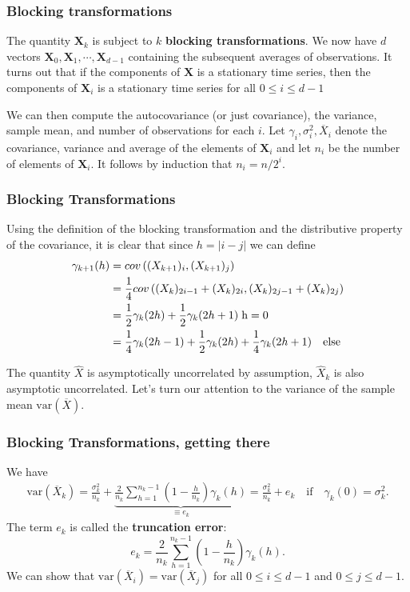 \documentclass{beamer}
\begin{document}
\begin{frame}
\frametitle{Blocking transformations}

The quantity $\bm{X}_k$ is
subject to $k$ \textbf{blocking transformations}.  We now have $d$ vectors
$\bm{X}_0, \bm{X}_1,\cdots,\bm{X}_{d-1}$ containing the subsequent
averages of observations. It turns out that if the components of
$\bm{X}$ is a stationary time series, then the components of
$\bm{X}_i$ is a stationary time series for all $0 \leq i \leq d-1$

We can then compute the autocovariance (or just covariance), the variance, sample mean, and
number of observations for each $i$. 
Let $\gamma_i, \sigma_i^2,
\overline{X}_i$ denote the covariance, variance and average of the
elements of $\bm{X}_i$ and let $n_i$ be the number of elements of
$\bm{X}_i$. It follows by induction that $n_i = n/2^i$.
\end{frame}

\begin{frame}
\frametitle{Blocking Transformations}

Using the
definition of the blocking transformation and the distributive
property of the covariance, it is clear that since $h =|i-j|$
we can define
\begin{align}
\gamma_{k+1}(h) &= cov\left( ({X}_{k+1})_{i}, ({X}_{k+1})_{j} \right) \nonumber \\
&=  \frac{1}{4}cov\left( ({X}_{k})_{2i-1} + ({X}_{k})_{2i}, ({X}_{k})_{2j-1} + ({X}_{k})_{2j} \right) \nonumber \\
&=  \frac{1}{2}\gamma_{k}(2h) + \frac{1}{2}\gamma_k(2h+1) \hspace{0.1cm} \mathrm{h = 0} \\
&=\frac{1}{4}\gamma_k(2h-1) + \frac{1}{2}\gamma_k(2h) + \frac{1}{4}\gamma_k(2h+1) \quad \mathrm{else}
\end{align}

The quantity $\hat{X}$ is asymptotically uncorrelated by assumption, $\hat{X}_k$ is also asymptotic uncorrelated. Let's turn our attention to the variance of the sample
mean $\mathrm{var}(\overline{X})$.
\end{frame}

\begin{frame}
\frametitle{Blocking Transformations, getting there}

We have
\begin{align}
\mathrm{var}(\overline{X}_k) = \frac{\sigma_k^2}{n_k} + \underbrace{\frac{2}{n_k} \sum_{h=1}^{n_k-1}\left( 1 - \frac{h}{n_k} \right)\gamma_k(h)}_{\equiv e_k} = \frac{\sigma^2_k}{n_k} + e_k \quad \text{if} \quad \gamma_k(0) = \sigma_k^2. 
\end{align}
The term $e_k$ is called the \textbf{truncation error}: 
\begin{equation}
e_k = \frac{2}{n_k} \sum_{h=1}^{n_k-1}\left( 1 - \frac{h}{n_k} \right)\gamma_k(h). 
\end{equation}
We can show that $\mathrm{var}(\overline{X}_i) = \mathrm{var}(\overline{X}_j)$ for all $0 \leq i \leq d-1$ and $0 \leq j \leq d-1$.
\end{frame}
\end{document}
